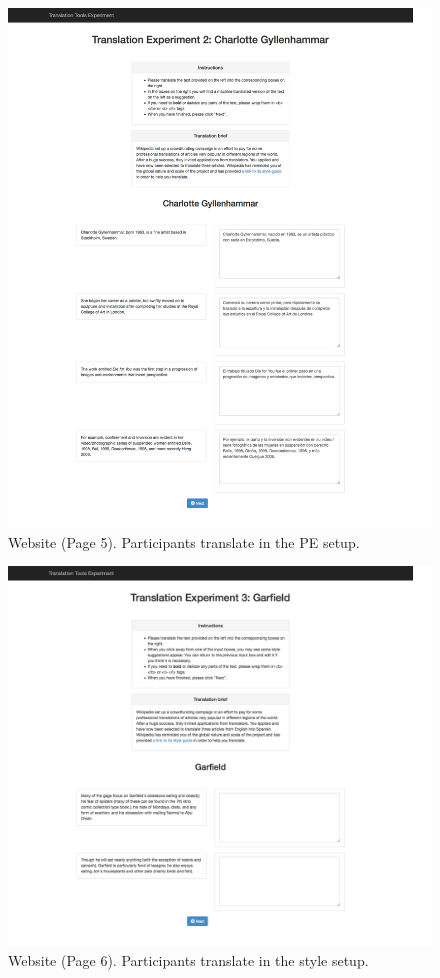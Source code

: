 \begin{figure}[h]
\myfloatalign
\includegraphics[width=\textwidth]{img/web/web_5.png}
\caption{Website (Page 5). Participants translate in the \ac{PE} setup.}
\label{fig:web_pe}
\end{figure}

\begin{figure}[h]
\myfloatalign
\includegraphics[width=\textwidth]{img/web/web_6.png}
\caption{Website (Page 6). Participants translate in the style setup.}
\label{fig:web_style}
\end{figure}

